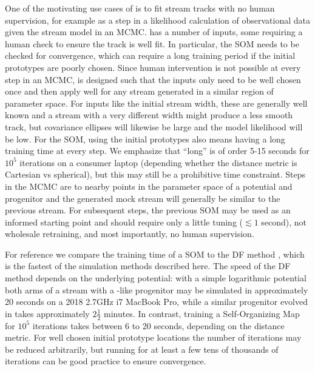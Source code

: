 \documentclass[fleqn,usenatbib]{mnras}
\begin{document}
    One of the motivating use cases of \trackstream{} is to fit stream tracks
    with no human supervision, for example as a step in a likelihood calculation
    of observational data given the stream model in an MCMC. \trackstream{} has
    a number of inputs, some requiring a human check to ensure the track is well
    fit. In particular, the SOM needs to be checked for convergence, which can
    require a long training period if the initial prototypes are poorly chosen.
    Since human intervention is not possible at every step in an MCMC,
    \trackstream{} is designed such that the inputs only need to be well chosen
    once and then apply well for any stream generated in a similar region of
    parameter space. For inputs like the initial stream width, these are
    generally well known and a stream with a very different width might produce
    a less smooth track, but covariance ellipses will likewise be large and the
    model likelihood will be low. For the SOM, using the initial prototypes also
    means having a long training time at every step. We emphasize that ``long''
    is of order 5-15 seconds for $10^5$ iterations on a consumer laptop
    (depending whether the distance metric is Cartesian vs spherical), but this
    may still be a prohibitive time constraint. Steps in the MCMC are to nearby
    points in the parameter space of a potential and progenitor and the
    generated mock stream will generally be similar to the previous stream. For
    subsequent steps, the previous SOM may be used as an informed starting point
    and should require only a little tuning ($\lesssim 1$ second), not wholesale
    retraining, and most importantly, no human supervision.

    For reference we compare the training time of a SOM to the DF method
    \citep{Bovy2014}, which is the fastest of the simulation methods described
    here. The speed of the DF method depends on the underlying potential: with a
    simple logarithmic potential both arms of a stream with a -like progenitor may be simulated in approximately 20 seconds on a 2018
    2.7GHz i7 MacBook Pro, while a similar progenitor evolved in
    \galpyMWPotential{} takes approximately $2\frac{1}{2}$ minutes. In contrast,
    training a Self-Organizing Map for $10^5$ iterations takes between 6 to 20
    seconds, depending on the distance metric. For well chosen initial prototype
    locations the number of iterations may be reduced arbitrarily, but running
    for at least a few tens of thousands of iterations can be good practice to
    ensure convergence.
\end{document}
